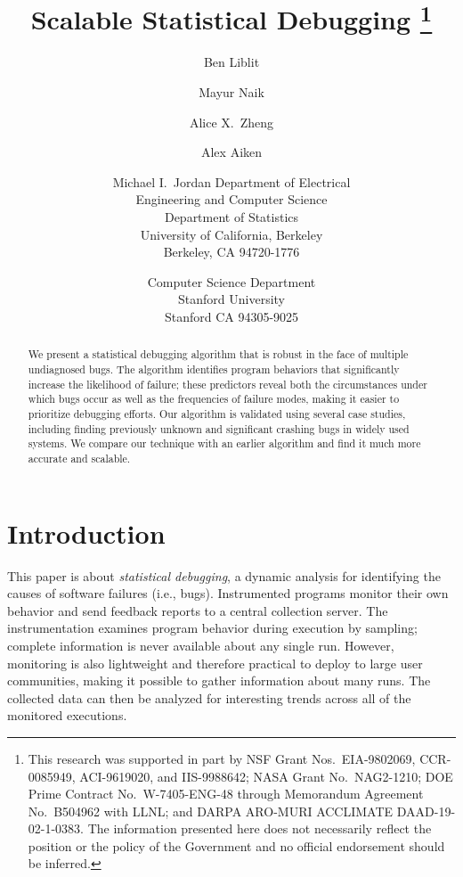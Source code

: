 \documentclass[draft]{sig-alternate}
\title{Scalable Statistical Debugging
  \renewcommand{\footnotemark}[0]{}
  \thanks{This research was supported in part by NSF Grant Nos.\
    EIA-9802069, CCR-0085949, ACI-9619020, and IIS-9988642; NASA Grant
    No.\ NAG2-1210; DOE Prime Contract No.\ W-7405-ENG-48 through
    Memorandum Agreement No.\ B504962 with LLNL; and DARPA ARO-MURI
    ACCLIMATE DAAD-19-02-1-0383.  The information presented here does
    not necessarily reflect the position or the policy of the
    Government and no official endorsement should be inferred.}}
\author{%
  Ben Liblit \eecs
  \and Mayur Naik \stan
  \and Alice X.\ Zheng \eecs
  \and Alex Aiken \stan
  \and Michael I.\ Jordan \both
  \moreauthors
  \eecs Department of Electrical \\
  Engineering and Computer Science \\
  \stat Department of Statistics \\
  University of California, Berkeley \\
  Berkeley, CA 94720-1776
  \and
  \stan Computer Science Department \\
  Stanford University \\
  Stanford CA 94305-9025
}
\newcommand{\termdef}[1]{\emph{#1}}
\newcommand{\issue}[2][]{}
\begin{document}
\issue[Mike]{I think that Section 5.1 would be better placed at the
end of Section 4.}

\maketitle

\begin{abstract}
  We present a statistical debugging algorithm that is
  robust in the face of multiple undiagnosed bugs.  The algorithm
  identifies program behaviors that significantly increase the
  likelihood of failure; these predictors reveal both the
  circumstances under which bugs occur as well as the frequencies of
  failure modes, making it easier to prioritize debugging efforts.
  Our algorithm is validated using several case studies, including finding
  previously unknown and significant crashing bugs in widely used systems.
  We compare our technique with an earlier algorithm and find it much more accurate 
  and scalable.
\end{abstract}






\section{Introduction}
\label{sec:introduction}

\issue[Alice]{Too much notation in introduction?}

This paper is about \termdef{statistical debugging}, a dynamic
analysis for identifying the causes of software failures (i.e., bugs).
Instrumented programs monitor their own behavior and send feedback
reports to a central collection server.  The instrumentation examines
program behavior during execution by sampling; complete information is
never available about any single run.  However, monitoring is also
lightweight and therefore practical to deploy to large user
communities, making it possible to gather information about many runs.
The collected data can then be analyzed for interesting trends across
all of the monitored executions.
\end{document}
